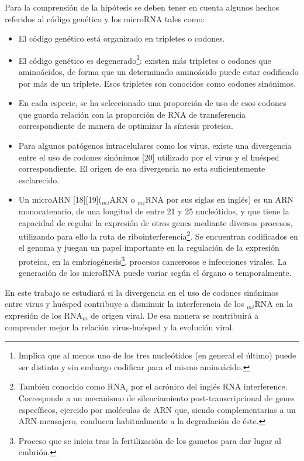 \documentclass[12pt,a4paper,spanish]{article}
\begin{document}
\par Para la comprensión de la hipótesis se deben tener en cuenta algunos hechos referidos al código genético y los microRNA tales como:
\begin{itemize}
	\item El código genético está organizado en tripletes o codones.
	\item El código genético es degenerado\footnote{Implica que al menos uno de los tres nucleótidos (en general el último) puede ser distinto y sin 				embargo codificar para el mismo aminoácido.}: existen más tripletes o codones que aminoácidos, de forma que un determinado aminoácido puede 				estar codificado por más de un triplete. Esos tripletes son conocidos como codones sinónimos. 
	\item En cada especie, se ha seleccionado una proporción de uso de esos codones que guarda relación con la proporción de RNA de transferencia  				correspondiente de manera de optimizar la síntesis proteica.
	\item Para algunos patógenos intracelulares como los virus, existe una divergencia entre el uso de codones sinónimos [20] utilizado por el virus y el 			huésped	correspondiente. El origen de esa divergencia no esta suficientemente esclarecido.
	\item Un microARN [18][19]($_m$$_i$ARN o $_m$$_i$RNA por sus siglas en inglés) es un ARN monocatenario, de una longitud de entre 21 y 25 nucleótidos, 							y que tiene la capacidad de regular la expresión de otros genes mediante diversos procesos, utilizando para ello la ruta de 						ribointerferencia\footnote{También conocido como RNA$_i$ por el acrónico del inglés RNA interference. Corresponde a un mecanismo 							de silenciamiento post-transcripcional de genes específicos, ejercido por moléculas de ARN que, siendo complementarias a un ARN 						mensajero, conducen habitualmente a la degradación de éste.}. Se encuentran codificados en el genoma y juegan un papel importante 							en la regulación de la expresión proteica, en la embriogénesis\footnote{Proceso que se inicia tras la fertilización de los gametos 							para dar lugar al embrión.}, procesos cancerosos e infecciones virales. La generación de los microRNA puede variar según el 						órgano o temporalmente. 
\end{itemize}

\par En este trabajo se estudiará si la divergencia en el uso de codones sinónimos entre virus y huésped contribuye a disminuir la interferencia de los $_m$$_i$RNA en la expresión de los RNA$_m$ de origen viral. De esa manera se contribuirá a comprender mejor la relación virus-huésped y la evolución viral.
\end{document}
